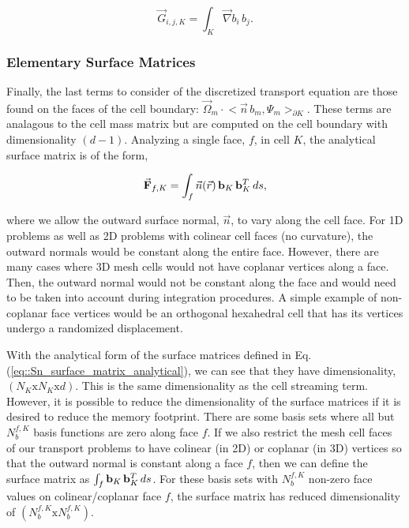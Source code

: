 \begin{equation}
\label{eq::Sn_streaming_matrix_entry}
\vec{G}_{i,j,K} =  \int_K \vec{\nabla}b_i \, b_j .
\end{equation}

\subsubsection{Elementary Surface Matrices}
\label{sec::Sn_Spatial_Matrices_Surface}

Finally, the last terms to consider of the discretized transport equation are those found on the faces of the cell boundary: $  \vec{\Omega}_m \cdot  \Big<  \vec{n} \, b_m, \Psi_m  \Big>_{\partial K}$. These terms are analagous to the cell mass matrix but are computed on the cell boundary with dimensionality $(d-1)$. Analyzing a single face, $f$, in cell $K$, the analytical surface matrix is of the form,

\begin{equation}
\label{eq::Sn_surface_matrix_analytical}
\vec{{\bf F}}_{f,K}  =    \int_f \vec{n} (\vec{r}) \, {\bf b}_K \, {\bf b}_K^T \, d s ,
\end{equation}

\noindent where we allow the outward surface normal, $\vec{n}$, to vary along the cell face. For 1D problems as well as 2D problems with colinear cell faces (no curvature), the outward normals would be constant along the entire face. However, there are many cases where 3D mesh cells would not have coplanar vertices along a face. Then, the outward normal would not be constant along the face and would need to be taken into account during integration procedures. A simple example of non-coplanar face vertices would be an orthogonal hexahedral cell that has its vertices undergo a randomized displacement.

With the analytical form of the surface matrices defined in Eq. (\ref{eq::Sn_surface_matrix_analytical}), we can see that they have dimensionality, $(N_K \text{x} N_K \text{x} d)$. This is the same dimensionality as the cell streaming term. However, it is possible to reduce the dimensionality of the surface matrices if it is desired to reduce the memory footprint. There are some basis sets where all but $N_b^{f,K}$ basis functions are zero along face $f$. If we also restrict the mesh cell faces of our transport problems to have colinear (in 2D) or coplanar (in 3D) vertices so that the outward normal is constant along a face $f$, then we can define the surface matrix as $\int_f {\bf b}_K \, {\bf b}_K^T \, d s$. For these basis sets with $N_b^{f,K}$ non-zero face values on colinear/coplanar face $f$, the surface matrix has reduced dimensionality of $(N_b^{f,K} \text{x} N_b^{f,K})$.

